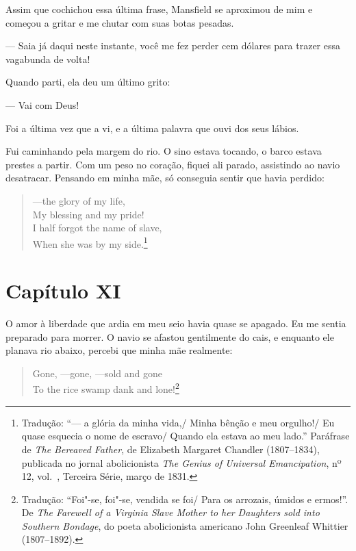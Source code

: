 Assim que cochichou essa última frase, Mansfield se aproximou de mim e
começou a gritar e me chutar com suas botas pesadas.

--- Saia já daqui neste instante, você me fez perder cem dólares para
trazer essa vagabunda de volta!

Quando parti, ela deu um último grito:

--- Vai com Deus!

Foi a última vez que a vi, e a última palavra que ouvi dos seus lábios.

Fui caminhando pela margem do rio. O sino estava tocando, o barco estava
prestes a partir. Com um peso no coração, fiquei ali parado, assistindo
ao navio desatracar. Pensando em minha mãe, só conseguia sentir que
havia perdido:

\begin{verse}
---the glory of my life,\\
My blessing and my pride!\\
I half forgot the name of slave,\\
When she was by my side.\footnote{Tradução: ``--- a glória da minha vida,/ Minha bênção e meu orgulho!/ Eu quase esquecia o nome de escravo/ Quando ela estava ao meu lado.'' Paráfrase de \emph{The Bereaved Father}, de Elizabeth
  Margaret Chandler (1807--1834), publicada no jornal abolicionista
  \emph{The Genius of Universal Emancipation}, nº 12, vol.~, Terceira
  Série, março de 1831.}
\end{verse}

\chapter*{Capítulo XI}

O amor à liberdade que ardia em meu seio havia quase se apagado. Eu me
sentia preparado para morrer. O navio se afastou gentilmente do cais, e
enquanto ele planava rio abaixo, percebi que minha mãe realmente:

\begin{verse}
Gone, ---gone, ---sold and gone\\
To the rice swamp dank and lone!\footnote{Tradução: ``Foi"-se, foi"-se, vendida se foi/ Para os arrozais, úmidos e ermos!''. De \emph{The Farewell of a Virginia Slave Mother to
  her Daughters sold into Southern Bondage}, do poeta abolicionista
  americano John Greenleaf Whittier (1807--1892).}
\end{verse}

